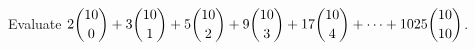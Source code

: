 Evaluate $2\dbinom{10}0+3\dbinom{10}1+5\dbinom{10}2+9\dbinom{10}3+17\dbinom{10}4+\cdots+1025\dbinom{10}{10}$.
